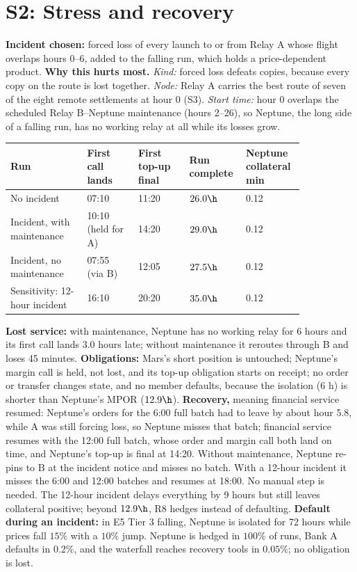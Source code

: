 \section{S2: Stress and recovery}\label{app:s2}
\textbf{Incident chosen:} forced loss of every launch to or from Relay A whose flight overlaps hours 0--6, added to the falling run, which holds a price-dependent product. \textbf{Why this hurts most.} \emph{Kind:} forced loss defeats copies, because every copy on the route is lost together. \emph{Node:} Relay A carries the best route of seven of the eight remote settlements at hour 0 (S3). \emph{Start time:} hour 0 overlaps the scheduled Relay B--Neptune maintenance (hours 2--26), so Neptune, the long side of a falling run, has no working relay at all while its losses grow.
\begin{table}[H]
\centering
\small
\begin{tabular}{@{}p{0.24\linewidth}p{0.16\linewidth}p{0.16\linewidth}p{0.12\linewidth}p{0.16\linewidth}@{}}
\toprule
Run & First call lands & First top-up final & Run complete & Neptune collateral min \\
\midrule
No incident & 07:10 & 11:20 & $26.0\h$ & 0.12 \\
Incident, with maintenance & 10:10 (held for A) & 14:20 & $29.0\h$ & 0.12 \\
Incident, no maintenance & 07:55 (via B) & 12:05 & $27.5\h$ & 0.12 \\
Sensitivity: 12-hour incident & 16:10 & 20:20 & $35.0\h$ & 0.12 \\
\bottomrule
\end{tabular}
\end{table}
\textbf{Lost service:} with maintenance, Neptune has no working relay for 6 hours and its first call lands 3.0 hours late; without maintenance it reroutes through B and loses 45 minutes. \textbf{Obligations:} Mars's short position is untouched; Neptune's margin call is held, not lost, and its top-up obligation starts on receipt; no order or transfer changes state, and no member defaults, because the isolation (6 h) is shorter than Neptune's MPOR ($12.9\h$). \textbf{Recovery,} meaning financial service resumed: Neptune's orders for the 6:00 full batch had to leave by about hour 5.8, while A was still forcing loss, so Neptune misses that batch; financial service resumes with the 12:00 full batch, whose order and margin call both land on time, and Neptune's top-up is final at 14:20. Without maintenance, Neptune re-pins to B at the incident notice and misses no batch. With a 12-hour incident it misses the 6:00 and 12:00 batches and resumes at 18:00. No manual step is needed. The 12-hour incident delays everything by 9 hours but still leaves collateral positive; beyond $12.9\h$, R8 hedges instead of defaulting. \textbf{Default during an incident:} in E5 Tier 3 falling, Neptune is isolated for 72 hours while prices fall $15\%$ with a $10\%$ jump. Neptune is hedged in $100\%$ of runs, Bank A defaults in $0.2\%$, and the waterfall reaches recovery tools in $0.05\%$; no obligation is lost.

